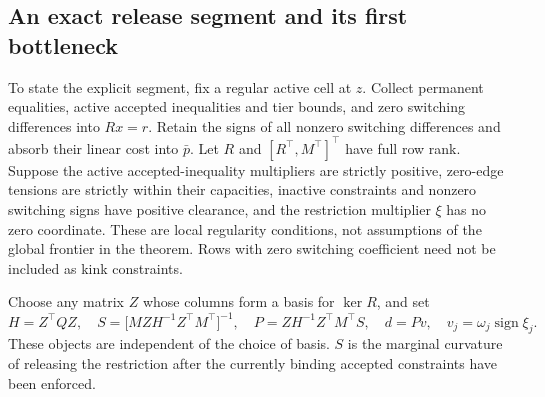 \documentclass[11pt,letterpaper]{article}
\theoremstyle{definition}\newtheorem{assumption}[theorem]{Assumption}
\begin{document}
\subsection{An exact release segment and its first bottleneck}
To state the explicit segment, fix a regular active cell at $z$. Collect permanent equalities, active accepted inequalities and tier bounds, and zero switching differences into $Rx=r$. Retain the signs of all nonzero switching differences and absorb their linear cost into $\bar p$. Let $R$ and $[R^\top,M^\top]^\top$ have full row rank. Suppose the active accepted-inequality multipliers are strictly positive, zero-edge tensions are strictly within their capacities, inactive constraints and nonzero switching signs have positive clearance, and the restriction multiplier $\xi$ has no zero coordinate. These are local regularity conditions, not assumptions of the global frontier in the theorem. Rows with zero switching coefficient need not be included as kink constraints.

Choose any matrix $Z$ whose columns form a basis for $\ker R$, and set
\begin{equation}\label{eq:release-matrices}
 H=Z^\top QZ,\quad
 S=\bigl[MZH^{-1}Z^\top M^\top\bigr]^{-1},\quad
 P=ZH^{-1}Z^\top M^\top S,\quad
 d=P v,\quad v_j=\omega_j\operatorname{sign}\xi_j.
\end{equation}
These objects are independent of the choice of basis. $S$ is the marginal curvature of releasing the restriction after the currently binding accepted constraints have been enforced.
\end{document}
